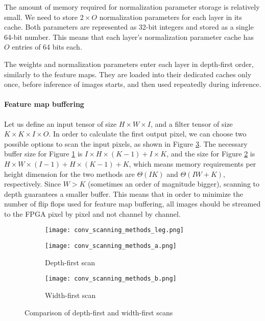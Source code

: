 \documentclass[conference]{IEEEtran}
\begin{document}
	The amount of memory required for normalization parameter storage is relatively small. We need to store $2\times O$ normalization parameters for each layer in its cache. Both  parameters are represented as 32-bit integers and stored as a single 64-bit number. This means that each layer's normalization parameter cache has $O$ entries of 64 bits each.   
	
	The weights and normalization parameters enter each layer in depth-first order, similarly to the feature maps. They are loaded into their dedicated caches only once, before inference of images starts, and then used repeatedly during inference. 
	
	\paragraph{Feature map buffering}
	Let us define an input tensor of size $H\times W\times I$, and a filter tensor of size $K\times K\times I\times O$. In order to calculate the first output pixel, we can choose two possible options to scan the input pixels, as shown in Figure \ref{conv_scan}. The necessary buffer size for Figure \ref{conv_scan_depth} is $I\times H\times (K-1) + I \times K$, and the size for Figure \ref{conv_scan_width} is $H\times W\times (I-1) + H\times (K-1)+ K$, which means memory requirements per height dimension for the two methods are $\Theta(IK)$ and $\Theta(IW+K)$, respectively. Since $W > K$ (sometimes an order of magnitude bigger), scanning to depth guarantees a smaller buffer.     
	This means that in order to minimize the number of flip flops used for feature map buffering, all images should be streamed to the FPGA pixel by pixel and not channel by channel.
	
	\begin{figure}	
		\begin{subfigure}{\linewidth}
			\texttt{[image: conv\_scanning\_methods\_leg.png]}
		\end{subfigure}
		
		\begin{subfigure}[b]{0.4565\linewidth}
			\texttt{[image: conv\_scanning\_methods\_a.png]}
			\caption{Depth-first scan} \label{conv_scan_depth}
		\end{subfigure}
		\hspace*{\fill} %
		\begin{subfigure}[b]{0.5017\linewidth}
			\texttt{[image: conv\_scanning\_methods\_b.png]}
			\caption{Width-first scan} \label{conv_scan_width}
		\end{subfigure}
		\vspace{-0.5em}
		\caption{Comparison of depth-first and width-first scans}
		\label{conv_scan} 
		\vspace{-1.2em}
	\end{figure} 
	
\end{document}
